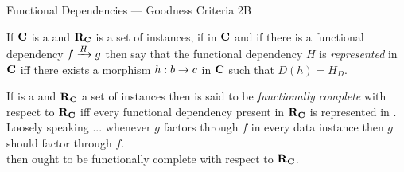 \iffalse
\begin{frame}{Definition of Functional Dependency (2)}
\begin{definition}
If $\catc$ is a \datacatw and if $\reqtc$ is a set of instances 
of \catcw then if 
\scalebox{0.9}{\multisourcenplusonediagram{n}{a}{b}{f}{c}{g}}
in \catcw then say that $g$ is functionally dependent of $f_1,...f_n$
iff $g$ is functionally dependent on $\fntuple$.
\end{definition}
\pause If $H$ is such a functional dependency then 
we say that $\fundep{H}{\set{f_1,f_2,...f_n}}{g}$ in $\catc$ with respect to $\reqtc$. 

This notation is adapted  from relational database theory. It doesn't imply a 2-category structure.
\end{frame}
\fi

\begin{frame}{Functional Dependencies --- Goodness Criteria 2B}
\begin{definition}
If $\catc$ is a \datacatw and $\reqtc$ is a set of instances, if
\fgsourcediag
in $\catc$ 
and if there is a functional dependency $\fundep{H}{f}{g}$ then say that 
the functional dependency $H$ is \textit{represented} in $\catc$ 
iff there exists a morphism $h:b \morph c$ in $\catc$ such that 
$D(h) = H_D$.
\end{definition}
\medskip
\pause If \catcw is a \datacatw and $\reqtc$ a set of instances then \catcw is said to be 
\textit{functionally complete} with respect to $\reqtc$ iff every functional dependency
present in $\reqtc$ is represented in \catc. Loosely speaking ... whenever $g$ factors through $f$ in every data instance then $g$ should factor through $f$.\\
\medskip
\pause {}\IfSforGammaCwithRCwords then \catcw ought to be functionally complete with respect to $\reqtc$.
\end{frame}

\newcommand{\incdsetup}{$
\begin{array}{c p{0.5cm} c p{0.5cm} c}
             &&\Rnode{bi}{b_i} &&              \\[0.5cm]
\Rnode{a}{a} &&                && \Rnode{c}{c}
\end{array}
\begin{arrows}
\ncarr{a}{bi}\alabel{f_i}
\ncarr{c}{bi}\blabel{q_i}
\end{arrows}
$}

\newcommand{\incdresolution}{$
\begin{array}{c p{0.5cm} c p{0.5cm} c}
             &&\Rnode{bi}{D(b_i)} &&              \\[0.5cm]
\Rnode{a}{D(a)} &&                && \Rnode{c}{D(c)}
\end{array}
\begin{arrows}
\ncarr{a}{bi}\alabel{D(f_i)}
\ncarr{c}{bi}\blabel{D(q_i)}
\ncarr{a}{c}\blabel{J_D}
\end{arrows}
$}

